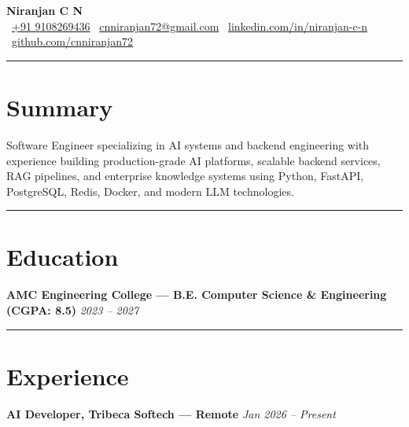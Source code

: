 \documentclass[a4paper,11pt]{article}
\newcommand{\sectionline}{
    \vspace{-9pt}
    \noindent\rule{\linewidth}{0.5pt}
    \vspace{-15pt}
}
\begin{document}

\begin{center}
{\LARGE \textbf{Niranjan C N}}\\[5pt]

\faPhone\ \href{tel:+919108269436}{+91 9108269436}
\quad
\faEnvelope\ \href{mailto:cnniranjan72@gmail.com}{cnniranjan72@gmail.com}
\quad
\faLinkedinSquare\
\href{https://linkedin.com/in/niranjan-c-n}{linkedin.com/in/niranjan-c-n}
\hfill
\faGithub\
\href{https://github.com/cnniranjan72}{github.com/cnniranjan72}

\end{center}

\sectionline


\section*{Summary}

Software Engineer specializing in AI systems and backend engineering with experience building production-grade AI platforms, scalable backend services, RAG pipelines, and enterprise knowledge systems using Python, FastAPI, PostgreSQL, Redis, Docker, and modern LLM technologies.

\sectionline


\section*{Education}

\textbf{AMC Engineering College — B.E. Computer Science \& Engineering (CGPA: 8.5)}
\hfill
\textit{2023 -- 2027}

\sectionline


\section*{Experience}

\textbf{AI Developer, Tribeca Softech — Remote}
\hfill
\textit{Jan 2026 -- Present}
\end{document}
